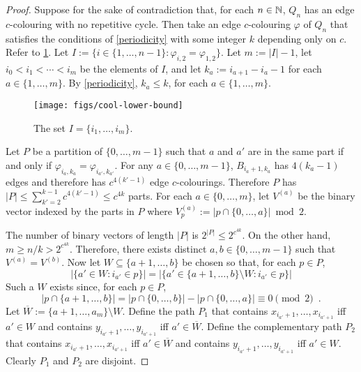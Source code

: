 \documentclass[kpfonts]{patmorin}
\begin{document}
\begin{proof}
    Suppose for the sake of contradiction that, for each $n\in\mathbb{N}$, $Q_n$ has an edge $c$-colouring with no repetitive cycle.  Then take an edge $c$-colouring $\varphi$ of $Q_n$ that satisfies the conditions of \cref{periodicity} with some integer $k$ depending only on $c$.  Refer to \cref{i_and_k}.  Let $I:=\{i\in\{1,\ldots,n-1\}:\varphi_{i,2}=\varphi_{1,2}\}$.  Let $m:=|I|-1$, let $i_0<i_1<\cdots< i_m$ be the elements of $I$, and let $k_a:=i_{a+1}-i_a-1$ for each $a\in\{1,\ldots,m\}$.  By \cref{periodicity}, $k_a\le k$, for each $a\in\{1,\ldots,m\}$.

    \begin{figure}
        \begin{center}
            \texttt{[image: figs/cool-lower-bound]}
        \end{center}
        \caption{The set $I=\{i_1,\ldots,i_m\}$.}
        \label{i_and_k}
    \end{figure}

    Let $P$ be a partition of $\{0,\ldots,m-1\}$ such that $a$ and $a'$ are in the same part if and only if $\varphi_{i_a,k_a}=\varphi_{i_{a'},k_{a'}}$.  For any $a\in\{0,\ldots,m-1\}$, $B_{i_a+1,k_a}$ has $4(k_a-1)$ edges and therefore has $c^{4(k'-1)}$ edge $c$-colourings.  Therefore $P$ has $|P|\le \sum_{k'=2}^{k-1} c^{4(k'-1)} \le c^{4k}$ parts.  For each $a\in\{0,\ldots,m\}$, let $V^{(a)}$ be the binary vector indexed by the parts in $P$ where $V^{(a)}_p := |p\cap\{0,\ldots,a\}|\bmod 2$.

    The number of binary vectors of length $|P|$ is $2^{|P|}\le 2^{c^{4k}}$.  On the other hand, $m \ge n/k > 2^{c^{4k}}$.  Therefore, there exists distinct $a,b\in\{0,\ldots,m-1\}$ such that $V^{(a)}=V^{(b)}$.  Now let $W\subseteq\{a+1,\ldots,b\}$ be chosen so that, for each $p\in P$,
    \[
        |\{a'\in W:i_{a'}\in p\}|
        = |\{a'\in \{a+1,\ldots,b\}\setminus W: i_{a'}\in p\}|
    \]
    Such a $W$ exists since, for each $p\in P$,
    \[
        |p\cap\{a+1,\ldots,b\}|=|p\cap\{0,\ldots,b\}|-|p\cap\{0,\ldots,a\}| \equiv 0 \pmod{2} \enspace .
    \]
    Let $\overline{W}:=\{a+1,\ldots,a_m\}\setminus W$.
    Define the path $P_1$ that contains $x_{i_{a'}+1},\ldots,x_{i_{a'+1}}$ iff $a'\in W$ and contains $y_{i_{a'}+1},\ldots,y_{i_{a'+1}}$ iff $a'\in\overline{W}$.  Define the complementary path $P_2$ that contains $x_{i_{a'}+1},\ldots,x_{i_{a'+1}}$ iff $a'\in\overline{W}$ and contains $y_{i_{a'}+1},\ldots,y_{i_{a'+1}}$ iff $a'\in W$.  Clearly $P_1$ and $P_2$ are disjoint.


\end{proof}
\end{document}
